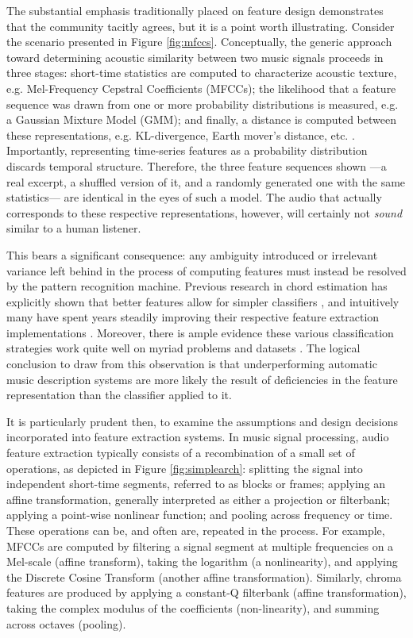 The substantial emphasis traditionally placed on feature design demonstrates that the community tacitly agrees, but it is a point worth illustrating.
Consider the scenario presented in Figure \ref{fig:mfccs}.
Conceptually, the generic approach toward determining acoustic similarity between two music signals proceeds in three stages: short-time statistics are computed to characterize acoustic texture, e.g. Mel-Frequency Cepstral Coefficients (MFCCs); the likelihood that a feature sequence was drawn from one or more probability distributions is measured, e.g. a Gaussian Mixture Model (GMM); and finally, a distance is computed between these representations, e.g. KL-divergence, Earth mover's distance, etc. \cite{Berenzweig2004Large}.
Importantly, representing time-series features as a probability distribution discards temporal structure.
Therefore, the three feature sequences shown ---a real excerpt, a shuffled version of it, and a randomly generated one with the same statistics--- are identical in the eyes of such a model.
The audio that actually corresponds to these respective representations, however, will certainly not \emph{sound} similar to a human listener.

This bears a significant consequence: any ambiguity introduced or irrelevant variance left behind in the process of computing features must instead be resolved by the pattern recognition machine.
Previous research in chord estimation has explicitly shown that better features allow for simpler classifiers \cite{Cho2010Exploring}, and intuitively many have spent years steadily improving their respective feature extraction implementations \cite{Lyon2010Sound,Mueller2011Chroma}.
Moreover, there is ample evidence these various classification strategies work quite well on myriad problems and datasets \cite{Bishop2006Pattern}.
The logical conclusion to draw from this observation is that underperforming automatic music description systems are more likely the result of deficiencies in the feature representation than the classifier applied to it.

It is particularly prudent then, to examine the assumptions and design decisions incorporated into feature extraction systems.
In music signal processing, audio feature extraction typically consists of a recombination of a small set of operations, as depicted in Figure \ref{fig:simplearch}: splitting the signal into independent short-time segments, referred to as blocks or frames; applying an affine transformation, generally interpreted as either a projection or filterbank; applying a point-wise nonlinear function; and pooling across frequency or time.
These operations can be, and often are, repeated in the process.
For example, MFCCs are computed by filtering a signal segment at multiple frequencies on a Mel-scale (affine transform), taking the logarithm (a nonlinearity), and applying the Discrete Cosine Transform (another affine transformation).
Similarly, chroma features are produced by applying a constant-Q filterbank (affine transformation), taking the complex modulus of the coefficients (non-linearity), and summing across octaves (pooling).

